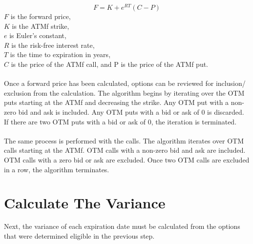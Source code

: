\documentclass[11pt, oneside]{book}
\begin{document}
\begin{equation} 
F=K+e^{RT}(C-P)
\end{equation}\label{Eq-ATMf}
$F$ is the forward price,\\
$K$ is the ATMf strike,\\
$e$ is Euler's constant,\\
$R$ is the risk-free interest rate,\\
$T$ is the time to expiration in years,\\
$C$ is the price of the ATMf call, and P is the price of the ATMf put.\\
\\
Once a forward price has been calculated, options can be reviewed for inclusion/ exclusion from the calculation. The algorithm begins by iterating over the OTM puts starting at the ATMf and decreasing the strike. Any OTM put with a non-zero bid and ask is included. Any OTM puts with a bid or ask of 0 is discarded. If there are two OTM puts with a bid or ask of 0, the iteration is terminated.\\
\\
The same process is performed with the calls. The algorithm iterates over OTM calls starting at the ATMf. OTM calls with a non-zero bid and ask are included. OTM calls with a zero bid or ask are excluded. Once two OTM calls are excluded in a row, the algorithm terminates.

\section{Calculate The Variance} \label{CalcVix-CalcVariance}
Next, the variance of each expiration date must be calculated from the options that were determined eligible in the previous step.
\end{document}
